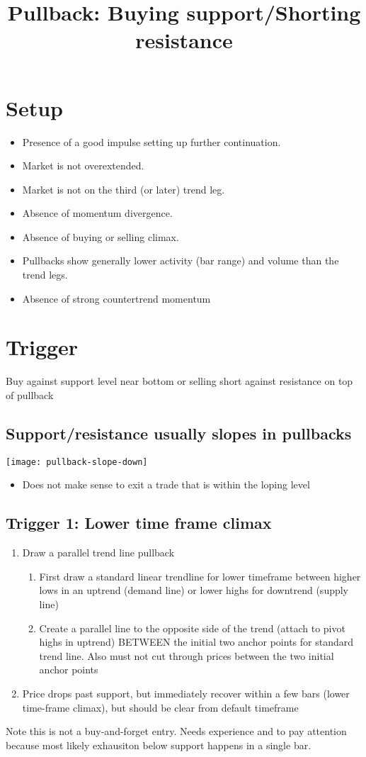\documentclass{../notes}
\title{Pullback: Buying support/Shorting resistance}
\begin{document}
\maketitle

\section{Setup}
\begin{itemize}
  \item Presence of a good impulse setting up further continuation.
  \item Market is not overextended.
  \item Market is not on the third (or later) trend leg.
  \item Absence of momentum divergence.
  \item Absence of buying or selling climax.
  \item Pullbacks show generally lower activity (bar range) and volume than the trend legs.
  \item Absence of strong countertrend momentum
\end{itemize}

\section{Trigger}
Buy against support level near bottom or selling short against resistance on top of pullback
\subsection{Support/resistance usually slopes in pullbacks}
\texttt{[image: pullback-slope-down]}
\begin{itemize}
  \item Does not make sense to exit a trade that is within the loping level
\end{itemize}

\subsection{Trigger 1: Lower time frame climax}
\begin{enumerate}
  \item Draw a parallel trend line pullback
  \begin{enumerate}
    \item First draw a standard linear trendline for lower timeframe between higher lows in an uptrend (demand line) or lower highs for downtrend (supply line)
    \item Create a parallel line to the opposite side of the trend (attach to pivot highs in uptrend) BETWEEN the initial two anchor points for standard trend line. Also must not cut through prices between the two initial anchor points
  \end{enumerate}
  \item Price drops past support, but immediately recover within a few bars (lower time-frame climax), but should be clear from default timeframe
\end{enumerate}
Note this is not a buy-and-forget entry. Needs experience and to pay attention because most likely exhausiton below support happens in a single bar.
\end{document}

